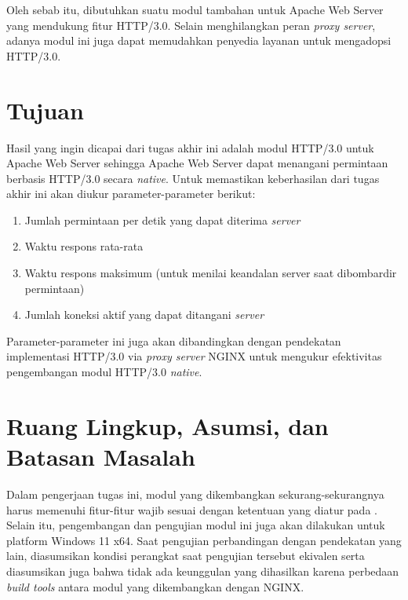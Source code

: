 Oleh sebab itu, dibutuhkan suatu modul tambahan untuk Apache Web Server yang mendukung fitur HTTP/3.0. Selain menghilangkan peran \textit{proxy server}, adanya modul ini juga dapat memudahkan penyedia layanan untuk mengadopsi HTTP/3.0.

\section{Tujuan}
Hasil yang ingin dicapai dari tugas akhir ini adalah modul HTTP/3.0 untuk Apache Web Server sehingga Apache Web Server dapat menangani permintaan berbasis HTTP/3.0 secara \textit{native}. Untuk memastikan keberhasilan dari tugas akhir ini akan diukur parameter-parameter berikut:
\begin{enumerate}
\item Jumlah permintaan per detik yang dapat diterima \textit{server}
\item Waktu respons rata-rata
\item Waktu respons maksimum (untuk menilai keandalan server saat dibombardir permintaan)
\item Jumlah koneksi aktif yang dapat ditangani \textit{server}
\end{enumerate}

Parameter-parameter ini juga akan dibandingkan dengan pendekatan implementasi HTTP/3.0 via \textit{proxy server} NGINX untuk mengukur efektivitas pengembangan modul HTTP/3.0 \textit{native}.

\section{Ruang Lingkup, Asumsi, dan Batasan Masalah}
Dalam pengerjaan tugas ini, modul yang dikembangkan sekurang-sekurangnya harus memenuhi fitur-fitur wajib sesuai dengan ketentuan yang diatur pada \cite{rfc2119}. Selain itu, pengembangan dan pengujian modul ini juga akan dilakukan untuk platform Windows 11 x64. Saat pengujian perbandingan dengan pendekatan yang lain, diasumsikan kondisi perangkat saat pengujian tersebut ekivalen serta diasumsikan juga bahwa tidak ada keunggulan yang dihasilkan karena perbedaan \textit{build tools} antara modul yang dikembangkan dengan NGINX.
